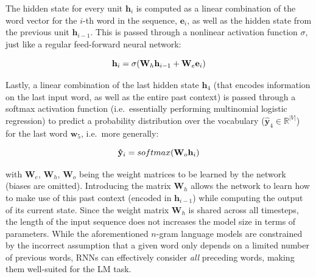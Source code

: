 \documentclass[12pt,a4paper,]{book}
\begin{document}
The hidden state for every unit \(\mathbf{h}_i\) is computed as a linear combination of the word vector for the \(i\)-th word in the sequence, \(\mathbf{e}_i\), as well as the hidden state from the previous unit \(\mathbf{h}_{i-1}\). This is passed through a nonlinear activation function \(\sigma\), just like a regular feed-forward neural network:

\begin{equation}
\mathbf{h}_i =  \sigma (\mathbf{W}_h \mathbf{h}_{i-1} + \mathbf{W}_e \mathbf{e}_{i}) \notag
\end{equation}

Lastly, a linear combination of the last hidden state \(\mathbf{h}_{4}\) (that encodes information on the last input word, as well as the entire past context) is passed through a softmax activation function \citep{goodfellow2016} (i.e.~essentially performing multinomial logistic regression) to predict a probability distribution over the vocabulary (\(\mathbf{\hat{y}}_4 \in \mathbb{R}^{|V|}\)) for the last word \(\mathbf{w}_5\), i.e.~more generally:

\begin{equation}
\mathbf{\hat{y}}_i =  softmax (\mathbf{W}_o \mathbf{h}_{i}) \notag
\end{equation}

with \(\mathbf{W}_e\), \(\mathbf{W}_h\), \(\mathbf{W}_o\) being the weight matrices to be learned by the network (biases are omitted). Introducing the matrix \(\mathbf{W}_h\) allows the network to learn how to make use of this past context (encoded in \(\mathbf{h}_{i-1}\)) while computing the output of its current state. Since the weight matrix \(\mathbf{W}_h\) is shared across all timesteps, the length of the input sequence does not increases the model size in terms of parameters. While the aforementioned \(n\)-gram language models are constrained by the incorrect assumption that a given word only depends on a limited number of previous words, RNNs can effectively consider \emph{all} preceding words, making them well-suited for the LM task.
\end{document}
